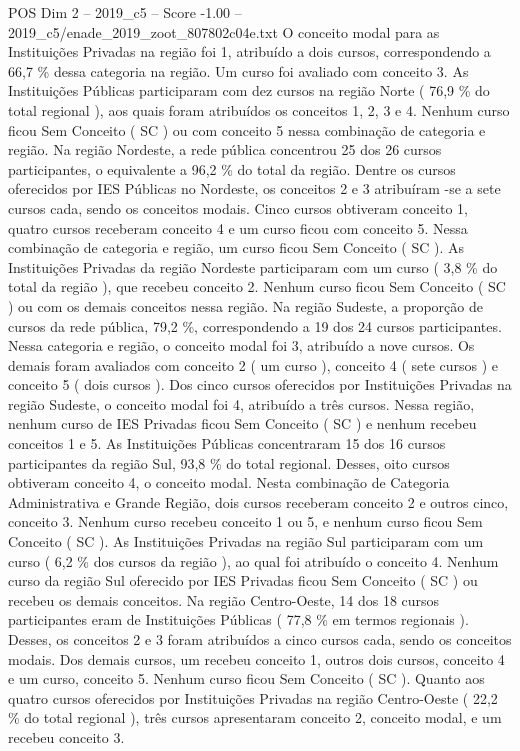 \begin{textsample}{POS Dim 2 – 2019\_c5 – Score -1.00 – 2019\_c5/enade\_2019\_zoot\_807802c04e.txt}
O conceito modal para as Instituições Privadas na região foi 1, atribuído a dois cursos, correspondendo a 66,7 \% dessa categoria na região.
Um curso foi avaliado com conceito 3.
As Instituições Públicas participaram com dez cursos na região Norte ( 76,9 \% do total regional ), aos quais foram atribuídos os conceitos 1, 2, 3 e 4.
Nenhum curso ficou Sem Conceito ( SC ) ou com conceito 5 nessa combinação de categoria e região.
Na região Nordeste, a rede pública concentrou 25 dos 26 cursos participantes, o equivalente a 96,2 \% do total da região.
Dentre os cursos oferecidos por IES Públicas no Nordeste, os conceitos 2 e 3 atribuíram -se a sete cursos cada, sendo os conceitos modais.
Cinco cursos obtiveram conceito 1, quatro cursos receberam conceito 4 e um curso ficou com conceito 5.
Nessa combinação de categoria e região, um curso ficou Sem Conceito ( SC ).
As Instituições Privadas da região Nordeste participaram com um curso ( 3,8 \% do total da região ), que recebeu conceito 2.
Nenhum curso ficou Sem Conceito ( SC ) ou com os demais conceitos nessa região.
Na região Sudeste, a proporção de cursos da rede pública, 79,2 \%, correspondendo a 19 dos 24 cursos participantes.
Nessa categoria e região, o conceito modal foi 3, atribuído a nove cursos.
Os demais foram avaliados com conceito 2 ( um curso ), conceito 4 ( sete cursos ) e conceito 5 ( dois cursos ).
Dos cinco cursos oferecidos por Instituições Privadas na região Sudeste, o conceito modal foi 4, atribuído a três cursos.
Nessa região, nenhum curso de IES Privadas ficou Sem Conceito ( SC ) e nenhum recebeu conceitos 1 e 5.
As Instituições Públicas concentraram 15 dos 16 cursos participantes da região Sul, 93,8 \% do total regional.
Desses, oito cursos obtiveram conceito 4, o conceito modal.
Nesta combinação de Categoria Administrativa e Grande Região, dois cursos receberam conceito 2 e outros cinco, conceito 3.
Nenhum curso recebeu conceito 1 ou 5, e nenhum curso ficou Sem Conceito ( SC ).
As Instituições Privadas na região Sul participaram com um curso ( 6,2 \% dos cursos da região ), ao qual foi atribuído o conceito 4.
Nenhum curso da região Sul oferecido por IES Privadas ficou Sem Conceito ( SC ) ou recebeu os demais conceitos.
Na região Centro-Oeste, 14 dos 18 cursos participantes eram de Instituições Públicas ( 77,8 \% em termos regionais ).
Desses, os conceitos 2 e 3 foram atribuídos a cinco cursos cada, sendo os conceitos modais.
Dos demais cursos, um recebeu conceito 1, outros dois cursos, conceito 4 e um curso, conceito 5.
Nenhum curso ficou Sem Conceito ( SC ).
Quanto aos quatro cursos oferecidos por Instituições Privadas na região Centro-Oeste ( 22,2 \% do total regional ), três cursos apresentaram conceito 2, conceito modal, e um recebeu conceito 3.

\end{textsample}
